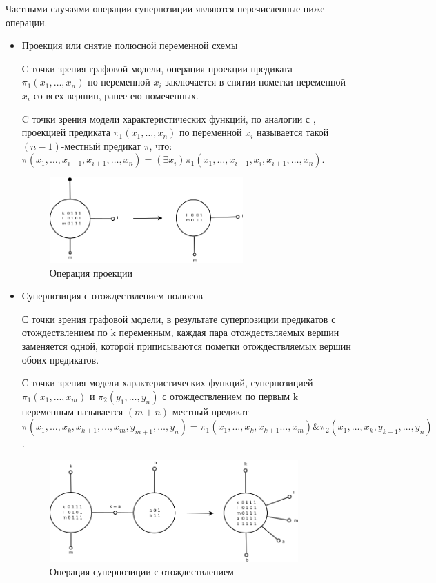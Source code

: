 \documentclass[12pt]{article}
\begin{document}
Частными случаями операции суперпозиции являются перечисленные ниже операции.

\label{operations}
\begin{itemize}
    \item Проекция или снятие полюсной переменной схемы
    
    С точки зрения графовой модели, операция проекции предиката $\pi_1(x_1, \dots, x_n)$ по переменной $x_i$
    заключается в снятии пометки переменной $x_i$ со всех вершин, ранее ею помеченных.

    C точки зрения модели характеристических функций,
    по аналогии с \cite{Marchenkov}, проекцией предиката $\pi_1(x_1, \dots, x_n)$ по переменной $x_i$ называется такой
    $(n-1)$-местный предикат $\pi$, что:
    $\pi(x_1, \dots, x_{i-1}, x_{i+1}, \dots, x_n) = (\exists x_i) \pi_1(x_1, \dots, x_{i-1}, x_i, x_{i+1}, \dots, x_n)$.

    \begin{figure}[htb]
    \centering
    \includegraphics[width=0.7\textwidth]{project_op.png}
    \caption{Операция проекции}
    \label{fig:project_op}
    \end{figure}

    \samepage
    \item Суперпозиция с отождествлением полюсов

    С точки зрения графовой модели, в результате суперпозиции предикатов с отождествлением по k переменным, каждая пара
    отождествляемых вершин заменяется одной, которой приписываются пометки отождествляемых вершин обоих предикатов.

    С точки зрения модели характеристических функций, 
    суперпозицией $\pi_1(x_1, \dots, x_m)$ и $\pi_2(y_1, \dots, y_n)$ с отождествлением по первым k переменным 
    называется $(m+n)$-местный предикат
    $\pi(x_1, \dots, x_k, x_{k+1}, \dots, x_m, y_{m+1}, \dots, y_n) = \pi_1(x_1, \dots, x_k, x_{k+1} \dots, x_m) \& \pi_2(x_1, \dots, x_k, y_{k+1}, \dots, y_n)$.

    \begin{figure}[htb]
    \centering
    \includegraphics[width=0.9\textwidth]{join_op.png}
    \caption{Операция суперпозиции с отождествлением}
    \label{fig:join_op}
    \samepage
    \end{figure}


\end{itemize}
\end{document}
